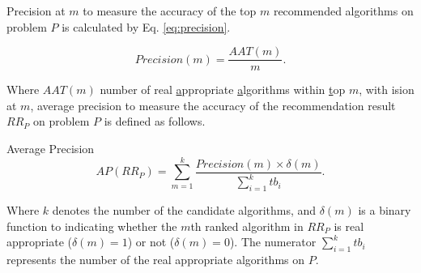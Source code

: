 \documentclass[acmsmall]{acmart}
\begin{document}
Precision at $m$ to measure the accuracy of the top $m$ recommended
algorithms on problem $P$ is calculated by Eq. \ref{eq:precision}.

\begin{equation}\label{eq:precision}
Precision(m) = \frac{AAT(m)}{m}.
\end{equation}

Where $AAT(m)$ number of real \underline{a}ppropriate
\underline{a}lgorithms within \underline{t}op $m$, with ision at
$m$, average precision \cite{baeza1999modern} to measure the
accuracy of the recommendation result $RR_{P}$ on problem $P$ is
defined as follows.

\begin{definition} Average Precision \label{def:averPrecsion}
	\begin{equation}
	AP(RR_{P}) = \sum_{m = 1}^{k}\frac{Precision(m)\times
		\delta(m)}{\sum_{i=1}^{k}tb_i}.
	\end{equation}
\end{definition}

Where $k$ denotes the number of the candidate algorithms, and
$\delta(m)$ is a binary function to indicating whether the $m$th
ranked algorithm in $RR_{P}$ is real appropriate ($\delta(m) = 1$)
or not ($\delta(m) = 0$). The numerator $\sum_{i=1}^{k}tb_i$
represents the number of the real appropriate algorithms on $P$.
\end{document}
